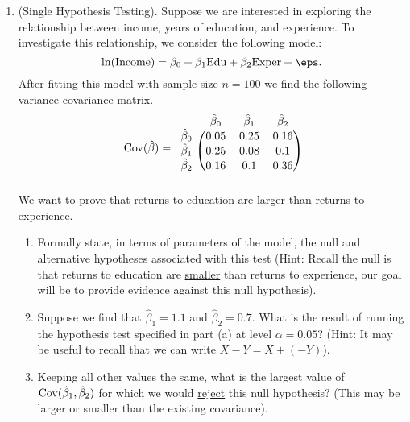 \documentclass[10pt]{article}
\begin{document}
\begin{enumerate}
	\item (Single Hypothesis Testing). Suppose we are interested in exploring the relationship between income, years of education, and experience. To investigate this relationship, we consider the following model:
	 \[
		 \ln(\text{Income}) = \beta_0 + \beta_1\text{Edu} + \beta_2\text{Exper} + \eps
	.\] 
	After fitting this model with sample size \(n=100\) we find the following variance covariance matrix.
	\begin{equation*}
	\Cov(\hat\beta) = 
	  \begin{blockarray}{lccc}
		  & {\hat\beta_0} &{\hat\beta_1} &{\hat\beta_2}\\
		  \begin{block}{l(ccc)}
		  {\hat\beta_0} & 0.05 & 0.25 & 0.16 \\
		  {\hat\beta_1} & 0.25 & 0.08 & 0.1 \\
		  {\hat\beta_2} & 0.16 & 0.1 & 0.36 \\
	  	  \end{block}
	  \end{blockarray}
	\end{equation*}
	We want to prove that returns to education are larger than returns to experience.
	\begin{enumerate}
		\item Formally state, in terms of parameters of the model, the null and alternative hypotheses associated with this test (Hint: Recall the null is that returns to education are \underline{smaller} than returns to experience, our goal will be to provide evidence against this null hypothesis).

		 
		\item Suppose we find that \(\hat\beta_1 = 1.1\) and \(\hat\beta_2 = 0.7\). What is the result of running the hypothesis test specified in part (a) at level \(\alpha = 0.05\)? (Hint: It may be useful to recall that we can write  \(X- Y = X + (-Y)\)).

		 
		\item Keeping all other values the same, what is the largest value of \(\operatorname{Cov}(\hat\beta_1,\hat\beta_2)\) for which we would \underline{reject} this null hypothesis? (This may be larger or smaller than the existing covariance).


\end{enumerate}
\end{enumerate}
\end{document}
